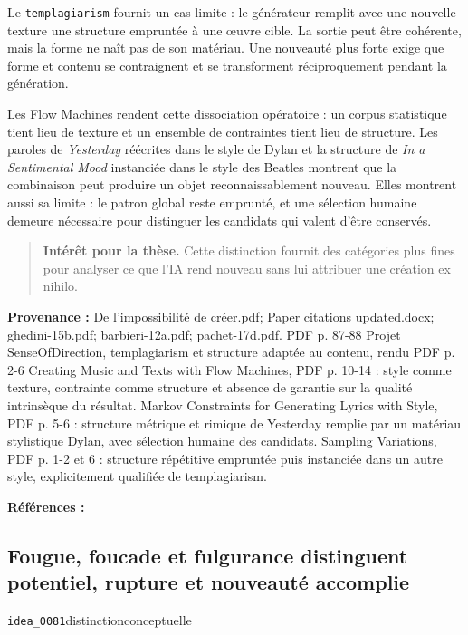 \documentclass[10pt,a4paper]{article}
\begin{document}
Le \texttt{templagiarism} fournit un cas limite : le générateur remplit avec une nouvelle texture une structure empruntée à une œuvre cible. La sortie peut être cohérente, mais la forme ne naît pas de son matériau. Une nouveauté plus forte exige que forme et contenu se contraignent et se transforment réciproquement pendant la génération.

Les Flow Machines rendent cette dissociation opératoire : un corpus statistique tient lieu de texture et un ensemble de contraintes tient lieu de structure. Les paroles de \emph{Yesterday} réécrites dans le style de Dylan et la structure de \emph{In a Sentimental Mood} instanciée dans le style des Beatles montrent que la combinaison peut produire un objet reconnaissablement nouveau. Elles montrent aussi sa limite : le patron global reste emprunté, et une sélection humaine demeure nécessaire pour distinguer les candidats qui valent d'être conservés.

\begin{quote}
\textbf{Intérêt pour la thèse.} Cette distinction fournit des catégories plus fines pour analyser ce que l'IA rend nouveau sans lui attribuer une création ex nihilo.
\end{quote}
{\footnotesize\color{metadata}\textbf{Provenance :} De l'impossibilité de créer.pdf; Paper citations updated.docx; ghedini-15b.pdf; barbieri-12a.pdf; pachet-17d.pdf. PDF p. 87-88 Projet SenseOfDirection, templagiarism et structure adaptée au contenu, rendu PDF p. 2-6 Creating Music and Texts with Flow Machines, PDF p. 10-14 : style comme texture, contrainte comme structure et absence de garantie sur la qualité intrinsèque du résultat. Markov Constraints for Generating Lyrics with Style, PDF p. 5-6 : structure métrique et rimique de Yesterday remplie par un matériau stylistique Dylan, avec sélection humaine des candidats. Sampling Variations, PDF p. 1-2 et 6 : structure répétitive empruntée puis instanciée dans un autre style, explicitement qualifiée de templagiarism.\par}
{\footnotesize\color{metadata}\textbf{Références :} \parencite{ghedini2015flowmachines,barbieri2012lyrics,pachet2017variations}\par}

\subsection{Fougue, foucade et fulgurance distinguent potentiel, rupture et nouveauté accomplie}
{\small\color{metadata} \texttt{idea\_0081}\quad\textbullet\quad distinction\quad\textbullet\quad conceptuelle\par}
\end{document}

